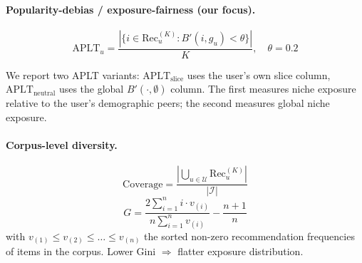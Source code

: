 \paragraph{Popularity-debias / exposure-fairness (our focus).}
\begin{equation}
\text{APLT}_u = \frac{|\{i \in \text{Rec}_u^{(K)} : B'(i, g_u) < \theta\}|}{K},\quad \theta = 0.2
\label{eq:aplt}
\end{equation}

We report two APLT variants: $\text{APLT}_{\text{slice}}$ uses the user's own slice column, $\text{APLT}_{\text{neutral}}$ uses the global $B'(\cdot, \emptyset)$ column. The first measures niche exposure relative to the user's demographic peers; the second measures global niche exposure.

\paragraph{Corpus-level diversity.}
\begin{equation}
\text{Coverage} = \frac{|\bigcup_{u \in \mathcal{U}} \text{Rec}_u^{(K)}|}{|\mathcal{I}|}
\label{eq:coverage}
\end{equation}
\begin{equation}
G = \frac{2 \sum_{i=1}^{n} i \cdot v_{(i)}}{n \sum_{i=1}^{n} v_{(i)}} - \frac{n+1}{n}
\label{eq:gini}
\end{equation}
with $v_{(1)} \leq v_{(2)} \leq \dots \leq v_{(n)}$ the sorted non-zero recommendation frequencies of items in the corpus. Lower Gini $\Rightarrow$ flatter exposure distribution.
